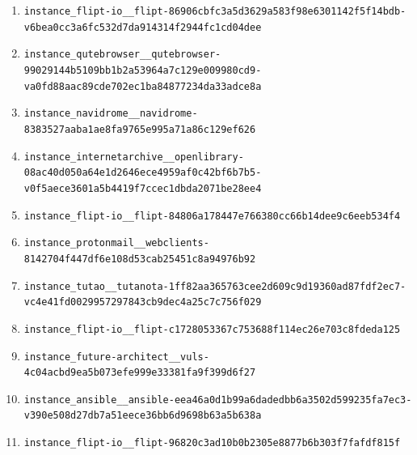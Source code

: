 \begin{enumerate}
\item \texttt{instance\_\allowbreak{}flipt-\allowbreak{}io\_\allowbreak{}\_\allowbreak{}flipt-\allowbreak{}86906cbfc3a5d3\allowbreak{}629a583f98e630\allowbreak{}1142f5f14bdb-\allowbreak{}v6bea0cc3a6fc5\allowbreak{}32d7da914314f2\allowbreak{}944fc1cd04dee}
\item \texttt{instance\_\allowbreak{}qutebrowser\_\allowbreak{}\_\allowbreak{}qutebrowser-\allowbreak{}99029144b5109b\allowbreak{}b1b2a53964a7c1\allowbreak{}29e009980cd9-\allowbreak{}va0fd88aac89cd\allowbreak{}e702ec1ba84877\allowbreak{}234da33adce8a}
\item \texttt{instance\_\allowbreak{}navidrome\_\allowbreak{}\_\allowbreak{}navidrome-\allowbreak{}8383527aaba1ae\allowbreak{}8fa9765e995a71\allowbreak{}a86c129ef626}
\item \texttt{instance\_\allowbreak{}internetarchiv\allowbreak{}e\_\allowbreak{}\_\allowbreak{}openlibrary-\allowbreak{}08ac40d050a64e\allowbreak{}1d2646ece4959a\allowbreak{}f0c42bf6b7b5-\allowbreak{}v0f5aece3601a5\allowbreak{}b4419f7ccec1db\allowbreak{}da2071be28ee4}
\item \texttt{instance\_\allowbreak{}flipt-\allowbreak{}io\_\allowbreak{}\_\allowbreak{}flipt-\allowbreak{}84806a178447e7\allowbreak{}66380cc66b14de\allowbreak{}e9c6eeb534f4}
\item \texttt{instance\_\allowbreak{}protonmail\_\allowbreak{}\_\allowbreak{}webclients-\allowbreak{}8142704f447df6\allowbreak{}e108d53cab2545\allowbreak{}1c8a94976b92}
\item \texttt{instance\_\allowbreak{}tutao\_\allowbreak{}\_\allowbreak{}tutanota-\allowbreak{}1ff82aa365763c\allowbreak{}ee2d609c9d1936\allowbreak{}0ad87fdf2ec7-\allowbreak{}vc4e41fd002995\allowbreak{}7297843cb9dec4\allowbreak{}a25c7c756f029}
\item \texttt{instance\_\allowbreak{}flipt-\allowbreak{}io\_\allowbreak{}\_\allowbreak{}flipt-\allowbreak{}c1728053367c75\allowbreak{}3688f114ec26e7\allowbreak{}03c8fdeda125}
\item \texttt{instance\_\allowbreak{}future-\allowbreak{}architect\_\allowbreak{}\_\allowbreak{}vuls-\allowbreak{}4c04acbd9ea5b0\allowbreak{}73efe999e33381\allowbreak{}fa9f399d6f27}
\item \texttt{instance\_\allowbreak{}ansible\_\allowbreak{}\_\allowbreak{}ansible-\allowbreak{}eea46a0d1b99a6\allowbreak{}dadedbb6a3502d\allowbreak{}599235fa7ec3-\allowbreak{}v390e508d27db7\allowbreak{}a51eece36bb6d9\allowbreak{}698b63a5b638a}
\item \texttt{instance\_\allowbreak{}flipt-\allowbreak{}io\_\allowbreak{}\_\allowbreak{}flipt-\allowbreak{}96820c3ad10b0b\allowbreak{}2305e8877b6b30\allowbreak{}3f7fafdf815f}

\end{enumerate}
